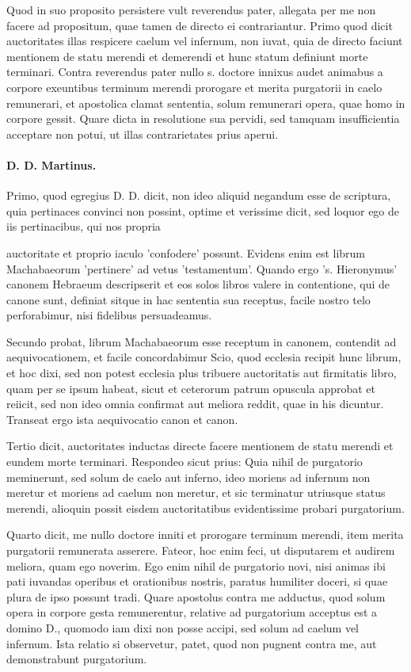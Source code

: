 Quod in suo proposito persistere vult reverendus pater, allegata per me non facere ad propositum, quae tamen de directo ei contrariantur. Primo quod dicit auctoritates illas respicere caelum vel infernum, non iuvat, quia de directo faciunt mentionem de statu merendi et demerendi et hunc \marginpar{\small[325]} statum definiunt morte terminari. Contra reverendus pater nullo s. doctore innixus audet animabus a corpore exeuntibus terminum merendi prorogare et merita purgatorii in caelo remunerari, et apostolica clamat sententia, solum remunerari opera, quae homo in corpore gessit. Quare dicta in resolutione sua pervidi, sed tamquam insufficientia acceptare non potui, ut illas contrarietates prius aperui.

\paragraph*{D. D. Martinus.}

Primo, quod egregius D. D. dicit, non ideo aliquid negandum esse de scriptura, quia pertinaces convinci non possint, optime et verissime dicit, sed loquor ego de iis pertinacibus, qui nos propria

auctoritate et proprio iaculo 'confodere' possunt. Evidens enim est librum Machabaeorum 'pertinere' ad vetus 'testamentum'. Quando ergo 's. Hieronymus' canonem Hebraeum descripserit et eos solos libros valere in contentione, qui de canone sunt, definiat sitque in hac sententia sua receptus, facile nostro telo perforabimur, nisi fidelibus persuadeamus.

Secundo probat, librum Machabaeorum esse receptum in canonem, contendit ad aequivocationem, et facile concordabimur Scio, quod ecclesia recipit hunc librum, et hoc dixi, sed non potest ecclesia plus tribuere auctoritatis aut firmitatis libro, quam per se ipsum habeat, sicut et ceterorum patrum opuscula approbat et reiicit, sed non ideo omnia confirmat aut meliora reddit, quae in his dicuntur. Transeat ergo ista aequivocatio canon et canon.

Tertio dicit, auctoritates inductas directe facere mentionem de statu merendi et eundem morte terminari. Respondeo sicut prius: Quia nihil de purgatorio meminerunt, sed solum de caelo aut inferno, ideo moriens ad infernum non meretur et moriens ad caelum non meretur, et sic terminatur utriusque status merendi, alioquin possit eisdem auctoritatibus evidentissime probari purgatorium.

Quarto dicit, me nullo doctore inniti et prorogare terminum merendi, item merita purgatorii remunerata asserere. Fateor, hoc enim feci, ut disputarem et audirem meliora, quam ego noverim. Ego enim nihil de purgatorio novi, nisi animas ibi pati iuvandas operibus et orationibus nostris, paratus humiliter doceri, si quae plura de ipso possunt tradi. Quare apostolus contra me adductus, quod solum opera in corpore gesta remunerentur, relative ad purgatorium acceptus est a domino D., quomodo iam dixi non posse accipi, sed solum ad caelum vel infernum. Ista relatio si observetur, patet, quod non pugnent contra me, aut demonstrabunt purgatorium.

